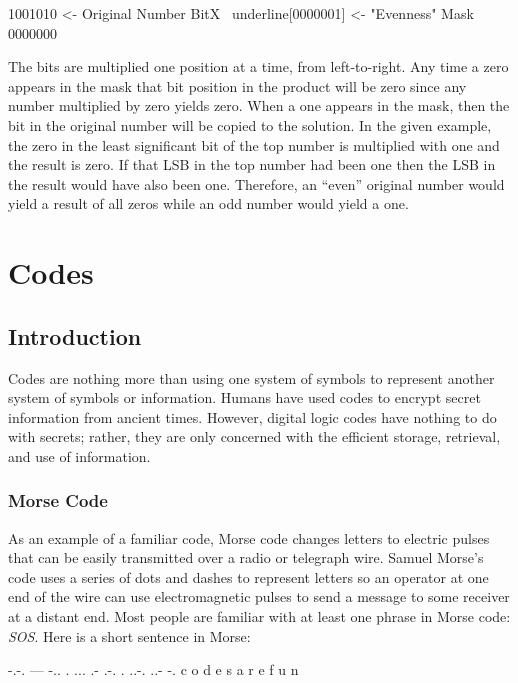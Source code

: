 \begin{binDisp}[commandchars=~\[\]]
         1001010  <- Original Number
    BitX ~underline[0000001]  <- "Evenness" Mask
         0000000
\end{binDisp}

The bits are multiplied one position at a time, from left-to-right. Any time a zero appears in the mask that bit position in the product will be zero since any number multiplied by zero yields zero. When a one appears in the mask, then the bit in the original number will be copied to the solution. In the given example, the zero in the least significant bit of the top number is multiplied with one and the result is zero. If that \ac{LSB} in the top number had been one then the \ac{LSB} in the result would have also been one. Therefore, an ``even'' original number would yield a result of all zeros while an odd number would yield a one.

\section{Codes}
\label{MO:sec:codes}

\subsection{Introduction}
\label{MO:sub:codes_introduction}

Codes are nothing more than using one system of symbols to represent another system of symbols or information. Humans have used codes to encrypt secret information from ancient times. However, digital logic codes have nothing to do with secrets; rather, they are only concerned with the efficient storage, retrieval, and use of information. 

\subsubsection{Morse Code}
\label{MO:subsub:morse_code}

As an example of a familiar code, Morse code changes letters to electric pulses that can be easily transmitted over a radio or telegraph wire. Samuel Morse's code uses a series of dots and dashes to represent letters so an operator at one end of the wire can use electromagnetic pulses to send a message to some receiver at a distant end. Most people are familiar with at least one phrase in Morse code: \emph{SOS}. Here is a short sentence in Morse: 

\begin{binDisp}[commandchars=~\[\]]
  -.-. --- -.. . ...   .- .-. .   ..-. ..- -.
   c    o   d  e  s    a   r  e    f    u  n
\end{binDisp}

